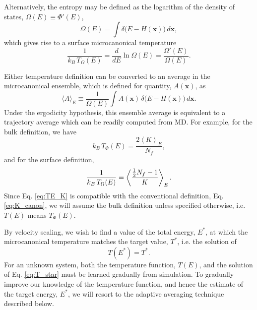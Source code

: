 \documentclass[reprint]{revtex4-1}
\begin{document}
Alternatively, the entropy may be defined
as the logarithm of the density of states,
$\Omega(E) \equiv \Phi'(E)$,
%
\begin{equation}
  \Omega(E)
  =
  \int
    \delta\bigl( E - H(\mathbf x) \bigr)
    \, d\mathbf x
  ,
  \label{eq:DOSE}
\end{equation}
%
which gives rise to a surface microcanonical temperature
%
\begin{equation}
  \frac{1}{ k_B \, T_\Omega(E) }
  =
  \frac{ d }{ dE }
  \ln \Omega(E)
  =
  \frac{ \Omega'(E) }
       { \Omega(E)  }
  .
  \label{eq:betaE_surf_def}
\end{equation}



Either temperature definition can be converted to
an average in the microcanonical ensemble,
which is defined for quantity, $A(\mathbf x)$, as
$$
  \langle A \rangle_E
  \equiv
  \frac{ 1 } { \Omega(E) }
  \int A(\mathbf x) \,
    \delta\bigl( E - H(\mathbf x) \bigr) \, d\mathbf x
  .
$$
Under the ergodicity hypothesis,
this ensemble average is equivalent to a trajectory average
which can be readily computed from MD.
%
For example, for the bulk definition, we have
%
\begin{equation}
  k_B \, T_\Phi(E)
  =
  \frac{ 2 \left\langle K \right\rangle_E } { N_f }
  ,
  \label{eq:TE_K}
\end{equation}
%
and for the surface definition,
%
\begin{equation}
  \frac{ 1 } { k_B \, T_\Omega(E) }
  =
  \left\langle
  \frac{ \frac{1}{2} N_f - 1 } { K }
  \right\rangle_E
  .
  \notag
\end{equation}
%
Since Eq. \eqref{eq:TE_K} is compatible
with the conventional definition,
Eq. \eqref{eq:K_canon},
we will assume the bulk definition
unless specified otherwise,
i.e. $T(E)$ means $T_\Phi(E)$.
%
%


By velocity scaling, we wish to
find a value of the total energy, $E^*$,
at which the microcanonical temperature
matches the target value, $T^*$,
i.e. the solution of
%
\begin{equation}
  T(E^*)
  =
  T^*
  .
  \label{eq:T_star}
\end{equation}
%
For an unknown system,
both the temperature function, $T(E)$,
and the solution of Eq. \eqref{eq:T_star}
must be learned gradually from simulation.
%
To gradually improve
our knowledge of the temperature function,
and hence the estimate of the target energy, $E^*$,
we will resort to the adaptive averaging technique
described below.
\end{document}
